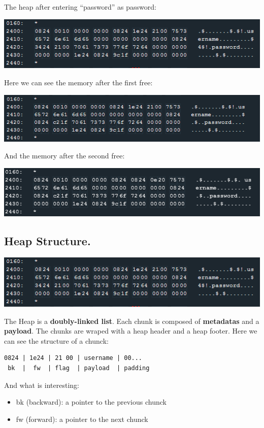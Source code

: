 The heap after entering ``password'' as password:

\includegraphics{img/14_9.PNG}

Here we can see the memory after the first free:

\includegraphics{img/14_10.PNG}

And the memory after the second free:

\includegraphics{img/14_11.PNG}

\subsection{Heap Structure.}\label{heap-structure.}

\includegraphics{img/14_9.PNG}

The Heap is a \textbf{doubly-linked list}. Each chunk is composed of
\textbf{metadatas} and a \textbf{payload}. The chunks are wraped with a
heap header and a heap footer. Here we can see the structure of a
chunck:

\begin{verbatim}
0824 | 1e24 | 21 00 | username | 00...
 bk  |  fw  | flag  | payload  | padding
\end{verbatim}

And what is interesting:

\begin{itemize}
\itemsep1pt\parskip0pt
\item
  bk (backward): a pointer to the previous chunck
\item
  fw (forward): a pointer to the next chunck
\end{itemize}

